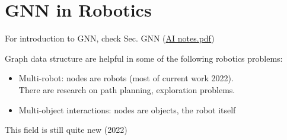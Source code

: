 \chapter{GNN in Robotics}
For introduction to \ac{GNN}, check Sec. \ac{GNN} (\href{AI_notes.pdf}{AI notes.pdf})

Graph data structure are helpful in some of the following robotics problems:
\begin{itemize}
	\item Multi-robot: nodes are robots (most of current work 2022).\\
	There are research on path planning, exploration problems.
	\item Multi-object interactions: nodes are objects, the robot itself 
\end{itemize}

This field is still quite new (2022)